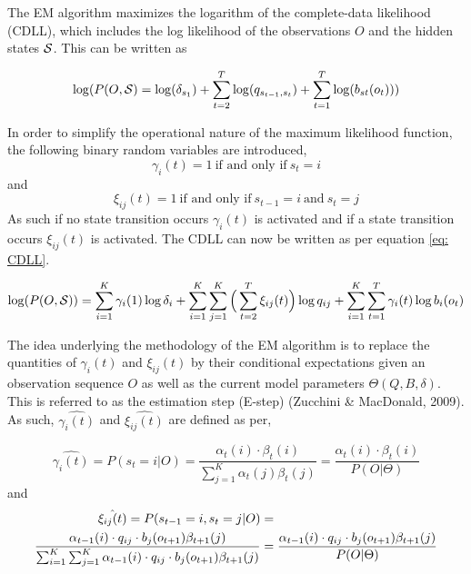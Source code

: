 The EM algorithm maximizes the logarithm of the complete-data likelihood (CDLL), which includes the log likelihood of the observations $O$ and the hidden states $\S$. This can be written as

\begin{equation}
    \log(P(O,\S) = \log(\delta_{s_1}) + \sum_{t=2}^T \log(q_{s_{t-1},s_t})+\sum_{t=1}^T \log(b_{st}(o_t)))
    \label{eq: alternative_log_likelihood}
\end{equation}

In order to simplify the operational nature of the maximum likelihood function, the following binary random variables are introduced,
$$
\gamma_i(t) = 1 \ \text{if and only if}\ s_t = i
$$
and
$$
\xi_{ij}(t) = 1 \ \text{if and only if}\ s_{t-1}=i\ \text{and}\ s_t = j
$$
As such if no state transition occurs $\gamma_i(t)$ is activated and if a state transition occurs $\xi_{ij}(t)$ is activated. The CDLL can now be written as per equation \ref{eq: CDLL}.

\begin{equation}
    \log(P(O, \S)) = \sum_{i=1}^K \gamma_i(1) \log\delta_i + \sum_{i=1}^K \sum_{j=1}^K \Big(\sum_{t=2}^T \xi_{ij}(t)\Big) \log q_{ij}+ \sum_{i=1}^K \sum_{t=1}^T \gamma_i(t) \log b_i(o_t) 
    \label{eq: CDLL}
\end{equation}

The idea underlying the methodology of the EM algorithm is to replace the quantities of $\gamma_i(t)$ and $\xi_{ij}(t)$ by their conditional expectations given an observation sequence $O$ as well as the current model parameters $\Theta(Q, B,\delta)$. This is referred to as the estimation step (E-step) (Zucchini \& MacDonald, 2009). As such, $\hat{\gamma_i(t)}$ and $\hat{\xi_{ij}(t)}$ are defined as per,

\begin{equation}
    \hat{\gamma_i(t)} = P(s_t=i | O) = \frac{\alpha_t(i) \cdot \beta_t(i)}{\sum_{j=1}^K \alpha_t(j)\beta_t(j)} = \frac{\alpha_t(i) \cdot \beta_t(i)}{P(O|\Theta)}
    \label{eq: gamma}
\end{equation}
and
\begin{align}
    \hat{\xi_{ij}(t)} = P(s_{t-1}=i, s_t=j|O) &= \label{eq: xi} \\ 
    \frac{\alpha_{t-1}(i) \cdot q_{ij} \cdot b_j(o_{t+1})\beta_{t+1}(j)}
            {\sum_{i=1}^K\sum_{j=1}^K\alpha_{t-1}(i) \cdot q_{ij} \cdot b_j(o_{t+1})\beta_{t+1}(j)}
    &= \frac{\alpha_{t-1}(i) \cdot q_{ij} \cdot b_j(o_{t+1})\beta_{t+1}(j)}{P(O|\Theta)}  \notag
\end{align}

